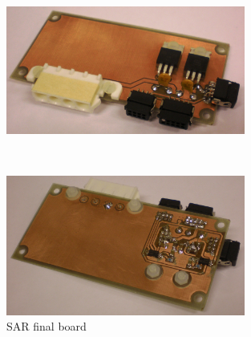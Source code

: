 \begin{figure}[H]
\begin{minipage}[t]{\linewidth}
\centering
\includegraphics[width=0.7\textwidth]{figures/fig_SAR_top}
\end{minipage}
\\[1mm]
\begin{minipage}[t]{\linewidth}
\centering
\includegraphics[width=0.7\textwidth]{figures/fig_SAR_bottom}
\end{minipage}
\caption{\acl{SAR} final board}
\label{fig:SAR_top_bottom}
\end{figure}
%
